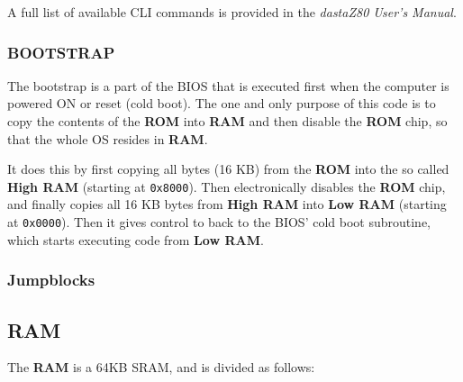         A full list of available CLI commands is provided in the
        \textit{dastaZ80 User’s Manual}.

        \subsubsection{BOOTSTRAP}

        The bootstrap is a part of the BIOS that is executed first when the
        computer is powered ON or reset (cold boot). The one and only purpose of
        this code is to copy the contents of the \textbf{ROM} into \textbf{RAM}
        and then disable the \textbf{ROM} chip, so that the whole OS resides in
        \textbf{RAM}.

        It does this by first copying all bytes (16 KB) from the \textbf{ROM}
        into the so called \textbf{High RAM} (starting at \texttt{0x8000}). Then
        electronically disables the \textbf{ROM} chip, and finally copies all 16
        KB bytes from \textbf{High RAM} into \textbf{Low RAM} (starting at
        \texttt{0x0000}). Then it gives control to back to the BIOS' cold boot
        subroutine, which starts executing code from \textbf{Low RAM}.

        \subsubsection{Jumpblocks}

    \subsection{RAM}
    \label{subsec:memmap:ram}

    The \textbf{RAM} is a 64KB SRAM, and is divided as follows:

